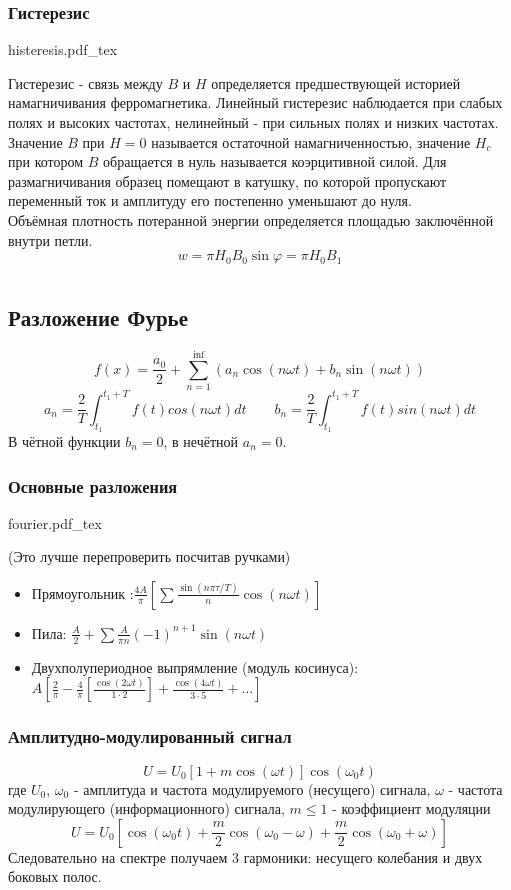 \documentclass{article}
\newcommand{\incfig}[2][1]{%
    \def\svgwidth{#1\columnwidth}
    {#2.pdf_tex}
}
\begin{document}
\subsubsection{Гистерезис}
\incfig{histeresis}
Гистерезис - связь между $B$ и $H$ определяется предшествующей историей намагничивания ферромагнетика.
Линейный гистерезис наблюдается при слабых полях и высоких частотах, нелинейный - при сильных полях и низких частотах.
Значение $B$ при $H=0$ называется остаточной намагниченностью, значение $H_c$ при котором $B$ обращается в нуль называется коэрцитивной силой.
Для размагничивания образец помещают в катушку, по которой пропускают переменный ток и амплитуду его постепенно уменьшают до нуля.\\
Объёмная плотность потеранной энергии определяется площадью заключённой внутри петли.
\[w=\pi H_0B_0 \sin \varphi=\pi H_0B_1\]

\section{}
\subsection{Разложение Фурье}
\[f(x)=\frac{a_0}{2} + \sum_{n=1}^{\inf}(a_n \cos (n \omega t) + b_n \sin (n \omega t))\]
\[a_n = \frac{2}{T}\int_{t_1}^{t_1+T}f(t)cos(n\omega t)dt \qquad b_n = \frac{2}{T}\int_{t_1}^{t_1+T}f(t)sin(n\omega t)dt\]
В чётной функции $b_n=0$, в нечётной $a_n=0$.
\subsubsection{Основные разложения}
\incfig{fourier}
(Это лучше перепроверить посчитав ручками)
\begin{itemize}
    \item Прямоугольник :$\frac{4A}{\pi}[\sum\frac{\sin(n\pi\tau/T)}{n}\cos(n\omega t)]$
    \item Пила: $\frac{A}{2}+\sum\frac{A}{\pi n}(-1)^{n+1}\sin(n\omega t)$
    \item Двухполупериодное выпрямление (модуль косинуса): \\ $A[\frac{2}{\pi}-\frac{4}{\pi}[\frac{\cos(2\omega t)}{1\cdot2}] + \frac{\cos(4\omega t)}{3\cdot5} + ...]$
\end{itemize}
\subsubsection{Амплитудно-модулированный сигнал}
\[U=U_0[1+m\cos(\omega t)]\cos(\omega_0 t)\]
где $U_0$, $\omega_0$ - амплитуда и частота модулируемого (несущего) сигнала, $\omega$ - частота модулирующего (информационного) сигнала, $m\le1$ - коэффициент модуляции 
\[U=U_0[\cos(\omega_0 t) + \frac{m}{2}\cos(\omega_0 - \omega) + \frac{m}{2}\cos(\omega_0 + \omega)]\]
Следовательно на спектре получаем 3 гармоники: несущего колебания и двух боковых полос.
\end{document}
